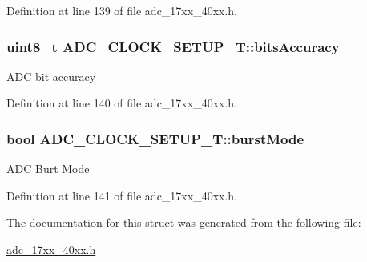 Definition at line 139 of file adc\+\_\+17xx\+\_\+40xx.\+h.

\subsubsection[{\texorpdfstring{bits\+Accuracy}{bitsAccuracy}}]{\setlength{\rightskip}{0pt plus 5cm}uint8\+\_\+t A\+D\+C\+\_\+\+C\+L\+O\+C\+K\+\_\+\+S\+E\+T\+U\+P\+\_\+\+T\+::bits\+Accuracy}\hypertarget{structADC__CLOCK__SETUP__T_aeb37891571691033d98087dabf6ddbd5}{}\label{structADC__CLOCK__SETUP__T_aeb37891571691033d98087dabf6ddbd5}
A\+DC bit accuracy 

Definition at line 140 of file adc\+\_\+17xx\+\_\+40xx.\+h.

\subsubsection[{\texorpdfstring{burst\+Mode}{burstMode}}]{\setlength{\rightskip}{0pt plus 5cm}bool A\+D\+C\+\_\+\+C\+L\+O\+C\+K\+\_\+\+S\+E\+T\+U\+P\+\_\+\+T\+::burst\+Mode}\hypertarget{structADC__CLOCK__SETUP__T_a92bc50d4472a36de38dac15a5fd3109a}{}\label{structADC__CLOCK__SETUP__T_a92bc50d4472a36de38dac15a5fd3109a}
A\+DC Burt Mode 

Definition at line 141 of file adc\+\_\+17xx\+\_\+40xx.\+h.



The documentation for this struct was generated from the following file\+:\begin{DoxyCompactItemize}
\item 
\hyperlink{adc__17xx__40xx_8h}{adc\+\_\+17xx\+\_\+40xx.\+h}\end{DoxyCompactItemize}
